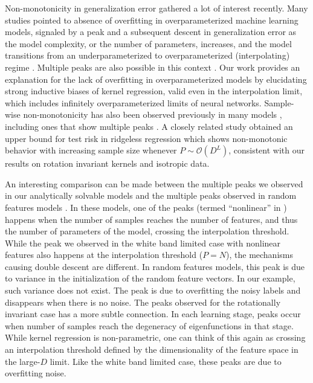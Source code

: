\documentclass[11pt]{article}
\begin{document}
Non-monotonicity in generalization error gathered a lot of interest recently. Many studies pointed to absence of overfitting in overparameterized machine learning models, signaled by a peak and a subsequent descent in generalization error as the model complexity, or the number of parameters, increases, and the model transitions from an underparameterized to overparameterized (interpolating) regime \cite{belkin2019reconciling,nakkiran2019deep,jacot2020implicit,montanari2019surprises,montanari2019generalization,dascoli2020double,dascoli2020triple,spigler2019jamming,mezard2020generalisation, liao2020random}. Multiple peaks are also possible in this context \cite{adlam2020neural}. Our work provides an explanation for the lack of overfitting in overparameterized models by elucidating strong inductive biases of kernel regression, valid even in the interpolation limit, which includes infinitely overparameterized limits of neural networks. Sample-wise non-monotonicity has also been observed previously in many models \cite{nakkiran2019deep,krogh,Hertz_1989, montanari2019surprises,nakkiran2019moredata}, including ones that show multiple peaks \cite{nakkiran2020optimal,dascoli2020triple,liang_isometry,chen2020multipledesign}. A closely related study obtained an upper bound for test risk in ridgeless regression which shows non-monotonic behavior with increasing sample size whenever $P\sim \mathcal{O}(D^L)$, consistent with our results on rotation invariant kernels and isotropic data. 

An interesting comparison can be made between the multiple peaks we observed in our analytically solvable models and the multiple peaks observed in random features models \cite{dascoli2020triple,adlam2020neural}. In these models, one of the peaks (termed ``nonlinear'' in \cite{dascoli2020triple}) happens when the number of samples reaches the number of features, and thus the number of parameters of the model, crossing the interpolation threshold. While the peak we observed in the white band limited case with nonlinear features also happens at the interpolation threshold ($P=N$), the mechanisms causing double descent are different. In random features models, this peak is due to variance in the initialization of the random feature vectors. In our example, such variance does not exist. The peak is due to overfitting the noisy labels and disappears when there is no noise. The peaks observed for the rotationally invariant case has a more subtle connection. In each learning stage, peaks occur when number of samples reach the degeneracy of eigenfunctions in that stage. While kernel regression is non-parametric, one can think of this again as crossing an interpolation threshold defined by the dimensionality of the feature space in the large-$D$ limit. Like the white band limited case, these peaks are due to overfitting noise.
\end{document}
